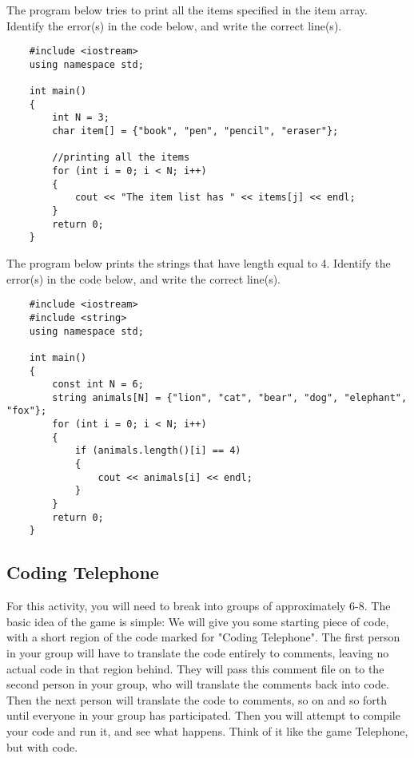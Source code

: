 \begin{multipart}
The program below tries to print all the items specified in the item array. Identify the error(s) in the code below, and write the correct line(s).
\end{multipart}

\begin{verbatim}
    #include <iostream>
    using namespace std;
    
    int main()
    {
        int N = 3;
        char item[] = {"book", "pen", "pencil", "eraser"};
    
        //printing all the items
        for (int i = 0; i < N; i++)
        {
            cout << "The item list has " << items[j] << endl;
        }
        return 0;
    }
\end{verbatim}

\begin{multipart}
The program below prints the strings that have length equal to 4. Identify the error(s) in the code below, and write the correct line(s).
\end{multipart}

\begin{verbatim}
    #include <iostream>
    #include <string>
    using namespace std;
    
    int main() 
    {
        const int N = 6;
        string animals[N] = {"lion", "cat", "bear", "dog", "elephant", "fox"};
        for (int i = 0; i < N; i++) 
        {
            if (animals.length()[i] == 4)
            {
                cout << animals[i] << endl;
            }
        }
        return 0;
    }
\end{verbatim}

\subsection{Coding Telephone}

For this activity, you will need to break into groups of approximately 6-8. The basic idea of the game is simple: We will give you some starting piece of code, with a short region of the code marked for "Coding Telephone". The first person in your group will have to translate the code entirely to comments, leaving no actual code in that region behind. They will pass this comment file on to the second person in your group, who will translate the comments back into code. Then the next person will translate the code to comments, so on and so forth until everyone in your group has participated. Then you will attempt to compile your code and run it, and see what happens. Think of it like the game Telephone, but with code.


